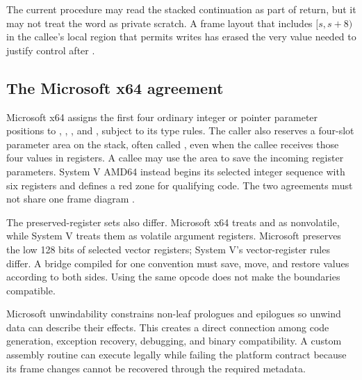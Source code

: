 \begin{warning}[title={The return address is caller-owned live data}]
The current procedure may read the stacked continuation as part of return, but
it may not treat the word as private scratch. A frame layout that includes
\([s,s+8)\) in the callee's local region that permits writes has erased the very value
needed to justify control after .
\end{warning}

\subsection{The Microsoft x64 agreement}

Microsoft x64 assigns the first four ordinary integer or pointer parameter
positions to , , , and , subject to its
type rules. The caller also reserves a four-slot parameter area on the stack,
often called , even when the callee receives those four
values in registers. A callee may use the area to save the incoming register
parameters. System V AMD64 instead begins its selected integer sequence with
six registers and defines a red zone for qualifying code. The two agreements
must not share one frame diagram \autocite{microsoft2025x64abi}.

The preserved-register sets also differ. Microsoft x64 treats  and
 as nonvolatile, while System V treats them as volatile argument
registers. Microsoft preserves the low 128 bits of selected vector registers;
System V's vector-register rules differ. A bridge compiled for one convention
must save, move, and restore values according to both sides. Using the same
 opcode does not make the boundaries compatible.

Microsoft unwindability constrains non-leaf prologues and epilogues so unwind
data can describe their effects. This creates a direct connection among code
generation, exception recovery, debugging, and binary compatibility. A custom
assembly routine can execute legally while failing the platform contract
because its frame changes cannot be recovered through the required metadata.

